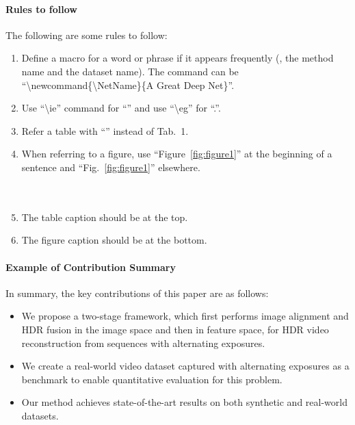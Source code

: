 \paragraph{Rules to follow} The following are some rules to follow:
\begin{enumerate}[itemsep=0pt,topsep=2bp]
    \item Define a macro for a word or phrase if it appears frequently (\eg, the method name and the dataset name). The command can be\\``\textbackslash newcommand\{\textbackslash NetName\}\{A Great Deep Net\}''.
    \item Use ``\textbackslash ie'' command for ``\ie'' and use ``\textbackslash eg'' for ``\eg.''.
    \item Refer a table with ``'' instead of Tab.~1.
    \item When referring to a figure, use ``Figure~\ref{fig:figure1}'' at the beginning of a sentence and ``Fig.~\ref{fig:figure1}'' elsewhere.\\
        \\
        \\
    \item The table caption should be at the top.
    \item The figure caption should be at the bottom.
\end{enumerate}


\vspace{3pt}
\paragraph{Example of Contribution Summary} In summary, the key contributions of this paper are as follows:  
\begin{itemize}[itemsep=0pt,parsep=0pt,topsep=2bp]
    \item We propose a two-stage framework, which first performs image alignment and HDR fusion in the image space and then in feature space, for HDR video reconstruction from sequences with alternating exposures.
    \item We create a real-world video dataset captured with alternating exposures as a benchmark to enable quantitative evaluation for this problem. 
    \item Our method achieves state-of-the-art results on both synthetic and real-world datasets.
\end{itemize}


